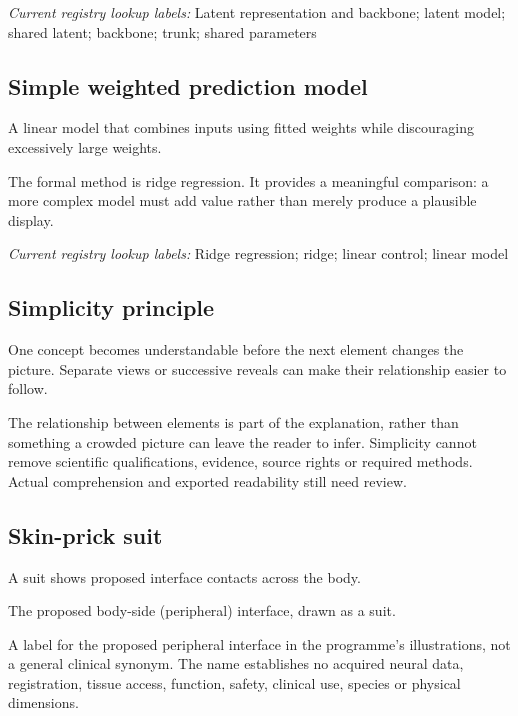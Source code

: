 \noindent\textit{Current registry lookup labels:} Latent representation and backbone; latent model; shared latent; backbone; trunk; shared parameters\par

\begin{samepage}
\subsection*{Simple weighted prediction model}
\noindent A linear model that combines inputs using fitted weights while discouraging excessively large weights.\par
\end{samepage}
\begin{samepage}
\noindent The formal method is ridge regression. It provides a meaningful comparison: a more complex model must add value rather than merely produce a plausible display.\par\nopagebreak[4]

\end{samepage}


\noindent\textit{Current registry lookup labels:} Ridge regression; ridge; linear control; linear model\par

\begin{samepage}
\subsection*{Simplicity principle}
\noindent One concept becomes understandable before the next element changes the picture. Separate views or successive reveals can make their relationship easier to follow.\par
\end{samepage}
\noindent The relationship between elements is part of the explanation, rather than something a crowded picture can leave the reader to infer. Simplicity cannot remove scientific qualifications, evidence, source rights or required methods. Actual comprehension and exported readability still need review.\par

\subsection*{Skin-prick suit}
\noindent A suit shows proposed interface contacts across the body.\par
\noindent The proposed body-side (peripheral) interface, drawn as a suit.\par
\noindent A label for the proposed peripheral interface in the programme's illustrations, not a general clinical synonym. The name establishes no acquired neural data, registration, tissue access, function, safety, clinical use, species or physical dimensions.\par

